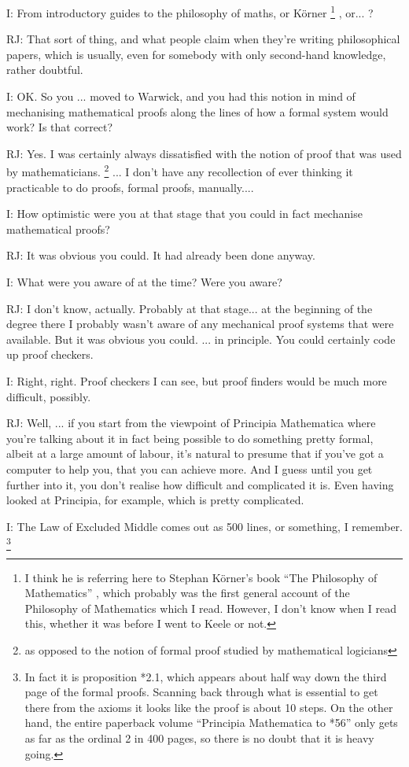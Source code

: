 \documentclass[10pt,titlepage]{book}
\begin{document}
I: From introductory guides to the philosophy of maths, or K\"orner%
\footnote{I think he is referring here to Stephan K\"orner's book ``The Philosophy of Mathematics'' \cite{korner1960}, which probably was the first general account of the Philosophy of Mathematics which I read.
However, I don't know when I read this, whether it was before I went to Keele or not.
}%
, or... ?

RJ: That sort of thing, and what people claim when they're writing philosophical papers, which is usually, even for somebody with only second-hand knowledge, rather doubtful.

I: OK. So you ... moved to Warwick, and you had this notion in mind of mechanising mathematical proofs along the lines of how a formal system would work?
Is that correct?

RJ: Yes.
I was certainly always dissatisfied with the notion of proof that was used by mathematicians.%
\footnote{
as opposed to the notion of formal proof studied by mathematical logicians}%
... I don't have any recollection of ever thinking it practicable to do proofs, formal proofs, manually....

I: How optimistic were you at that stage that you could in fact mechanise mathematical proofs?

RJ: It was obvious you could.
It had already been done anyway.

I: What were you aware of at the time?
Were you aware?

RJ: I don't know, actually.
Probably at that stage... at the beginning of the degree there I probably wasn't aware of any mechanical proof systems that were available.
But it was obvious you could.
... in principle.
You could certainly code up proof checkers.

I: Right, right.
Proof checkers I can see, but proof finders would be much more difficult, possibly.

RJ: Well, ...  if you start from the viewpoint of Principia Mathematica where you're talking about it in fact being possible to do something pretty formal, albeit at a large amount of labour, it's natural to presume that if you've got a computer to help you, that you can achieve more.
And I guess until you get further into it, you don't realise how difficult and complicated it is.
Even having looked at Principia, for example, which is pretty complicated.

I: The Law of Excluded Middle comes out as 500 lines, or something, I remember.%
\footnote{
In fact it is proposition *2.1, which appears about half way down the third page of the formal proofs.
Scanning back through what is essential to get there from the axioms it looks like the proof is about 10 steps.
On the other hand, the entire paperback volume ``Principia Mathematica to *56''\cite{russell1970} only gets as far as the ordinal 2 in 400 pages, so there is no doubt that it is heavy going.
}
\end{document}
